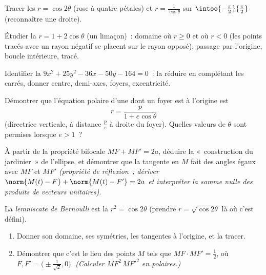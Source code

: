 \begin{exercise}[$\star$]\label{exo:b1:curves:4}
Tracer les  $r = \cos 2\theta$ (rose à quatre pétales) et
$r = \frac{1}{\cos\theta}$ sur $\intoo{-\frac\pi2}{\frac\pi2}$
(reconnaître une droite).
\end{exercise}

\begin{exercise}[$\star\star$]\label{exo:b1:curves:5}
Étudier la  $r = 1 + 2\cos\theta$ (un limaçon)~: domaine
où $r \geq 0$ et où $r < 0$ (les points tracés avec un rayon négatif
se placent sur le rayon opposé), passage par l'origine, boucle intérieure,
tracé.
\end{exercise}

\begin{exercise}[$\star\star$]\label{exo:b1:curves:6}
Identifier la  $9x^2 + 25y^2 - 36x - 50y - 164 = 0$~: la réduire en
complétant les carrés, donner centre, demi-axes, foyers, excentricité.
\end{exercise}

\begin{exercise}[$\star\star$]\label{exo:b1:curves:7}
Démontrer que l'équation polaire d'une  dont un foyer est à l'origine
est
\[
r = \frac{p}{1 + e\cos\theta}
\]
(directrice verticale, à distance $\frac pe$ à droite du foyer).
Quelles valeurs de $\theta$ sont permises lorsque $e > 1$~?
\end{exercise}

\begin{exercise}[$\star\star$]\label{exo:b1:curves:8}
À partir de la propriété bifocale $MF + MF' = 2a$, déduire la «~construction
du jardinier~» de l'ellipse, et démontrer que la tangente en $M$
fait des angles égaux avec $MF$ et $MF'$ \emph{(propriété de réflexion~;
dériver $\norm{M(t) - F} + \norm{M(t) - F'} = 2a$ et
interpréter la somme nulle des produits de vecteurs unitaires)}.
\end{exercise}

\begin{exercise}[$\star\star\star$]\label{exo:b1:curves:9}
La \emph{lemniscate de Bernoulli} est la  $r^2 = \cos
2\theta$ (prendre $r = \sqrt{\cos2\theta}$ là où c'est défini).
\begin{enumerate}
  \item Donner son domaine, ses symétries, les tangentes à l'origine, et
        la tracer.
  \item Démontrer que c'est le lieu des points $M$ tels que $MF \cdot MF'
        = \frac12$, où $F, F' = \bigl(\pm\frac{1}{\sqrt2},
        0\bigr)$. \emph{(Calculer $MF^2\,MF'^2$ en 
        polaires.)}
\end{enumerate}
\end{exercise}

